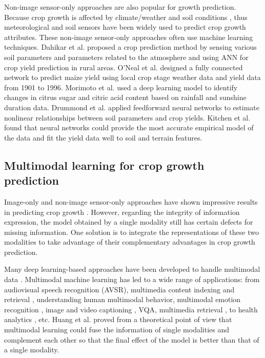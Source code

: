 \documentclass[acmsmall,manuscript, screen, review]{acmart}
\begin{document}
Non-image sensor-only approaches are also popular for growth prediction. Because crop growth is affected by climate/weather and soil conditions \cite{fortin_site-specific_2011,campbell_effect_1988,ehret_neural_2011}, thus meteorological and soil sensors have been widely used to predict crop growth attributes. These non-image sensor-only approaches often use machine learning techniques. Dahikar et al. \cite{dahikar_agricultural_2014} proposed a crop prediction method by sensing various soil parameters and parameters related to the atmosphere and using ANN for crop yield prediction in rural areas. O'Neal et al. \cite{oneal_neural_2002} designed a fully connected network to predict maize yield using local crop stage weather data and yield data from 1901 to 1996. Morimoto et al. \cite{morimoto_dynamic_2007} used a deep learning model to identify changes in citrus sugar and citric acid content based on rainfall and sunshine duration data. Drummond et al. \cite{drummond_application_1998} applied feedforward neural networks to estimate nonlinear relationships between soil parameters and crop yields. Kitchen et al. \cite{kitchen_soil_2003} found that neural networks could provide the most accurate empirical model of the data and fit the yield data well to soil and terrain features.





\subsection{Multimodal learning for crop growth prediction}
Image-only and non-image sensor-only approaches have shown impressive results in predicting crop growth \cite{padilla_proximal_2018}. However, regarding the integrity of information expression, the model obtained by a single modality still has certain defects for missing information. One solution is to integrate the representations of these two modalities to take advantage of their complementary advantages in crop growth prediction.

Many deep learning-based approaches have been developed to handle multimodal data \cite{sengupta_review_2020, 8269806, liang_foundations_2023}. Multimodal machine learning has led to a wide range of applications: from audiovisual speech recognition (AVSR)\cite{yuhas_integration_1989}, multimedia content indexing and retrieval \cite{snoek_multimodal_2005}, understanding human multimodal behavior, multimodal emotion recognition \cite{chen_heu_2021}, image and video captioning \cite{lei_video_2021}, VQA\cite{long_improving_2021}, multimedia retrieval \cite{souza_online_2021}, to health analytics \cite{yazdavar_multimodal_2020}, etc. Huang et al. \cite{huang_what_2021} proved from a theoretical point of view that multimodal learning could fuse the information of single modalities and complement each other so that the final effect of the model is better than that of a single modality.
\end{document}
